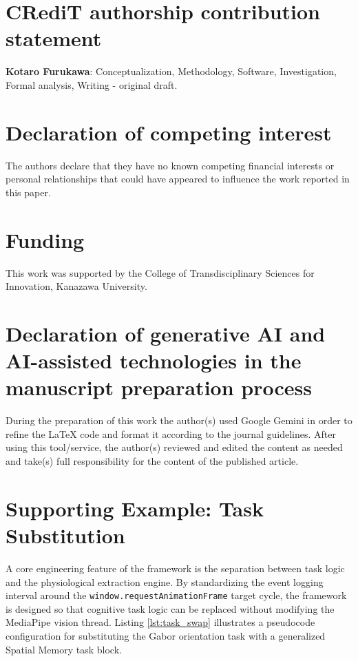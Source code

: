 \documentclass[final,3p,times,twocolumn]{elsarticle}
\begin{document}
\section*{CRediT authorship contribution statement}
\textbf{Kotaro Furukawa}: Conceptualization, Methodology, Software, Investigation, Formal analysis, Writing - original draft.

\section*{Declaration of competing interest}
The authors declare that they have no known competing financial interests or personal relationships that could have appeared to influence the work reported in this paper.

\section*{Funding}
This work was supported by the College of Transdisciplinary Sciences for Innovation, Kanazawa University.

\section*{Declaration of generative AI and AI-assisted technologies in the manuscript preparation process}
During the preparation of this work the author(s) used Google Gemini in order to refine the LaTeX code and format it according to the journal guidelines. After using this tool/service, the author(s) reviewed and edited the content as needed and take(s) full responsibility for the content of the published article.

\appendix
\section{Supporting Example: Task Substitution}
\label{sec:appendix_task}
A core engineering feature of the framework is the separation between task logic and the physiological extraction engine. By standardizing the event logging interval around the \texttt{window.requestAnimationFrame} target cycle, the framework is designed so that cognitive task logic can be replaced without modifying the MediaPipe vision thread. Listing \ref{lst:task_swap} illustrates a pseudocode configuration for substituting the Gabor orientation task with a generalized Spatial Memory task block.
\end{document}

